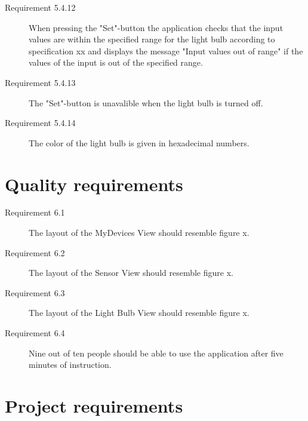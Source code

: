 \documentclass[a4paper]{article}
\begin{document}
\begin{description}
\item[Requirement 5.4.12] When pressing the "Set"-button the application checks that the input values are within the specified range for the light bulb according to specification xx and displays the message "Input values out of range" if the values of the input is out of the specified range.

\item[Requirement 5.4.13] The "Set"-button is unavalible when the light bulb is turned off.

\item[Requirement 5.4.14] The color of the light bulb is given in hexadecimal numbers.

\end{description}

\section{Quality requirements}

\begin{description}
\item[Requirement 6.1] The layout of the MyDevices View should resemble figure x.
\item[Requirement 6.2] The layout of the Sensor View should resemble figure x.
\item[Requirement 6.3] The layout of the Light Bulb View should resemble figure x.
\item[Requirement 6.4] Nine out of ten people should be able to use the application after five minutes of instruction. 

\end{description}


\section{Project requirements}
\end{document}
